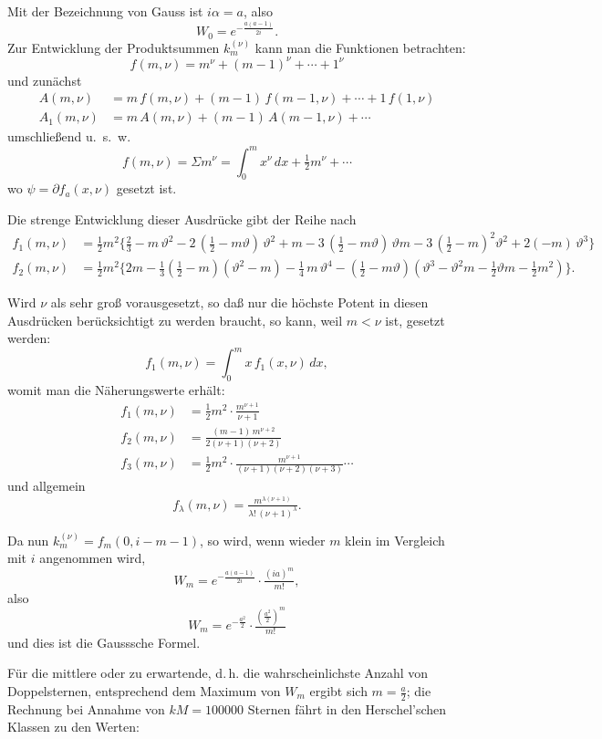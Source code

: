\documentclass[12pt,a4paper]{article}
\theoremstyle{plain}
\theoremstyle{definition}
\theoremstyle{remark}
\begin{document}
Mit der Bezeichnung von Gauss ist $i\alpha = a$, also
\[
W_0 = e^{-\frac{a(a-1)}{2i}}.
\]
Zur Entwicklung der Produktsummen $k_m^{(\nu)}$ kann man die Funktionen betrachten:
\[
f(m, \nu) = m^\nu + (m-1)^\nu + \cdots + 1^\nu
\]
und zun\"achst
\begin{align*}
A(m, \nu) &= m\,f(m, \nu) + (m-1)\,f(m-1, \nu) + \cdots + 1\,f(1, \nu) \\
A_1(m, \nu) &= m\,A(m, \nu) + (m-1)\,A(m-1, \nu) + \cdots
\end{align*}
umschlie\ss end u.\ s.\ w.
\[
f(m, \nu) = \Sigma m^\nu = \int_0^m x^\nu\,dx + \tfrac{1}{2}m^\nu + \cdots
\]
wo $\psi = \partial f_a(x, \nu)$ gesetzt ist.

Die strenge Entwicklung dieser Ausdr\"ucke gibt der Reihe nach
\begin{align*}
f_1(m, \nu) &= \tfrac{1}{2}m^2\bigl\{\tfrac{2}{3} - m\,\vartheta^2 - 2\,(\tfrac{1}{2} - m\vartheta)\,\vartheta^2 + m - 3\,(\tfrac{1}{2} - m\vartheta)\,\vartheta m - 3\,(\tfrac{1}{2} - m)^2\vartheta^2 + 2(-m)\,\vartheta^3\bigr\} \\
f_2(m, \nu) &= \tfrac{1}{2}m^2\bigl\{2m - \tfrac{1}{3}(\tfrac{1}{2} - m)(\vartheta^2 - m) - \tfrac{1}{4}\,m\,\vartheta^4 - (\tfrac{1}{2} - m\vartheta)(\vartheta^3 - \vartheta^2m - \tfrac{1}{2}\vartheta m - \tfrac{1}{2}m^2) \bigr\}.
\end{align*}

Wird $\nu$ als sehr gro\ss{} vorausgesetzt, so da\ss{} nur die h\"ochste Potent in diesen Ausdr\"ucken ber\"ucksichtigt zu werden braucht, so kann, weil $m < \nu$ ist, gesetzt werden:
\[
f_1(m, \nu) = \int_0^m x\,f_1(x, \nu)\,dx,
\]
womit man die N\"aherungswerte erh\"alt:
\begin{align*}
f_1(m, \nu) &= \tfrac{1}{2}m^2 \cdot \tfrac{m^{\nu+1}}{\nu+1} \\
f_2(m, \nu) &= \tfrac{(m-1)\,m^{\nu+2}}{2(\nu+1)(\nu+2)} \\
f_3(m, \nu) &= \tfrac{1}{2}m^2 \cdot \tfrac{m^{\nu+1}}{(\nu+1)(\nu+2)(\nu+3)} \cdots
\end{align*}
und allgemein
\[
f_\lambda(m, \nu) = \tfrac{m^{\lambda(\nu+1)}}{\lambda!\,(\nu+1)^\lambda}.
\]

Da nun $k_m^{(\nu)} = f_m(0, i-m-1)$, so wird, wenn wieder $m$ klein im Vergleich mit $i$ angenommen wird,
\[
W_m = e^{-\frac{a(a-1)}{2i}} \cdot \tfrac{(ia)^m}{m!},
\]
also
\[
W_m = e^{-\frac{a^2}{2}} \cdot \tfrac{(\tfrac{a^2}{2})^m}{m!}
\]
und dies ist die Gausssche Formel.

F\"ur die \glqq mittlere\grqq{} oder \glqq zu erwartende\grqq, d.\,h. die wahrscheinlichste Anzahl von Doppelsternen, entsprechend dem Maximum von $W_m$ ergibt sich $m = \tfrac{a}{2}$; die Rechnung bei Annahme von $kM = 100000$ Sternen f\"ahrt in den Herschel'schen Klassen zu den Werten:
\end{document}
